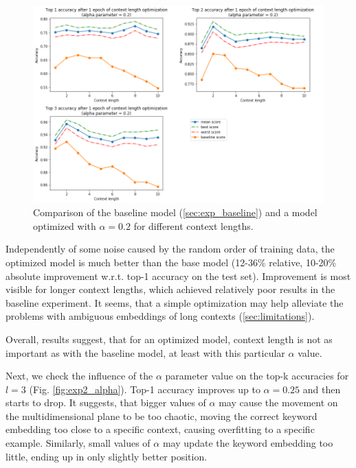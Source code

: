 \documentclass{llncs}
\begin{document}
\begin{figure}
    \centering
    \caption{Comparison of the baseline model (\ref{sec:exp_baseline}) and a model optimized with \(\alpha=0.2\) for different context lengths.}
    \label{fig:exp1_optimization}
    \includegraphics[scale=0.65]{res/exp1_context_top_acc.png}
\end{figure}

Independently of some noise caused by the random order of training data, the optimized model is much better than the base model (12-36\% relative, 10-20\% absolute improvement w.r.t. top-1 accuracy on the test set).
Improvement is most visible for longer context lengths, which achieved relatively poor results in the baseline experiment.
It seems, that a simple optimization may help alleviate the problems with ambiguous embeddings of long contexts (\ref{sec:limitations}).

Overall, results suggest, that for an optimized model, context length is not as important as with the baseline model, at least with this particular \(\alpha\) value.

Next, we check the influence of the \(\alpha\) parameter value on the top-k accuracies for \(l=3\) (Fig. \ref{fig:exp2_alpha}).
Top-1 accuracy improves up to \(\alpha=0.25\) and then starts to drop.
It suggests, that bigger values of \(\alpha\) may cause the movement on the multidimensional plane to be too chaotic, moving the correct keyword embedding too close to a specific context, causing overfitting to a specific example.
Similarly, small values of \(\alpha\) may update the keyword embedding too little, ending up in only slightly better position.
\end{document}
